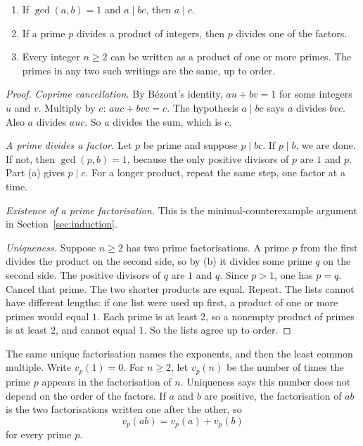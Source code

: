 \begin{propositionx}
\begin{enumerate}[label=(\alph*)]
\item If $\gcd(a,b)=1$ and $a\mid bc$, then $a\mid c$.
\item If a prime $p$ divides a product of integers, then $p$ divides one of the factors.
\item Every integer $n\ge2$ can be written as a product of one or more primes. The primes in any two such writings are the same, up to order.
\end{enumerate}
\end{propositionx}
\begin{proof}
\emph{Coprime cancellation.} By B\'ezout's identity, $au+bv=1$ for some integers $u$ and $v$. Multiply by $c$: $auc+bvc=c$. The hypothesis $a\mid bc$ says $a$ divides $bvc$. Also $a$ divides $auc$. So $a$ divides the sum, which is $c$.

\emph{A prime divides a factor.} Let $p$ be prime and suppose $p\mid bc$. If $p\mid b$, we are done. If not, then $\gcd(p,b)=1$, because the only positive divisors of $p$ are $1$ and $p$. Part (a) gives $p\mid c$. For a longer product, repeat the same step, one factor at a time.

\emph{Existence of a prime factorisation.} This is the minimal-counterexample argument in Section~\ref{sec:induction}.

\emph{Uniqueness.} Suppose $n\ge2$ has two prime factorisations. A prime $p$ from the first divides the product on the second side, so by (b) it divides some prime $q$ on the second side. The positive divisors of $q$ are $1$ and $q$. Since $p>1$, one has $p=q$. Cancel that prime. The two shorter products are equal. Repeat. The lists cannot have different lengths: if one list were used up first, a product of one or more primes would equal $1$. Each prime is at least $2$, so a nonempty product of primes is at least $2$, and cannot equal $1$. So the lists agree up to order.
\end{proof}

The same unique factorisation names the exponents, and then the least common multiple. Write $v_p(1)=0$. For $n\ge2$, let $v_p(n)$ be the number of times the prime $p$ appears in the factorisation of $n$. Uniqueness says this number does not depend on the order of the factors. If $a$ and $b$ are positive, the factorisation of $ab$ is the two factorisations written one after the other, so
\[
v_p(ab)=v_p(a)+v_p(b)
\]
for every prime $p$.

